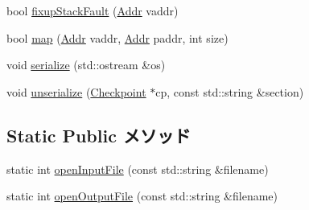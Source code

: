 \begin{DoxyCompactItemize}
\item 
bool \hyperlink{classProcess_a5bfc8cca2ce6b8a330e0c209468e5f71}{fixupStackFault} (\hyperlink{base_2types_8hh_af1bb03d6a4ee096394a6749f0a169232}{Addr} vaddr)
\item 
bool \hyperlink{classProcess_ac2bb68c3c87d0a046f848f537abb23fc}{map} (\hyperlink{base_2types_8hh_af1bb03d6a4ee096394a6749f0a169232}{Addr} vaddr, \hyperlink{base_2types_8hh_af1bb03d6a4ee096394a6749f0a169232}{Addr} paddr, int size)
\item 
void \hyperlink{classProcess_a53e036786d17361be4c7320d39c99b84}{serialize} (std::ostream \&os)
\item 
void \hyperlink{classProcess_af22e5d6d660b97db37003ac61ac4ee49}{unserialize} (\hyperlink{classCheckpoint}{Checkpoint} $\ast$cp, const std::string \&section)
\end{DoxyCompactItemize}
\subsection*{Static Public メソッド}
\begin{DoxyCompactItemize}
\item 
static int \hyperlink{classProcess_acea5ecbb223871b0d852b03b68837461}{openInputFile} (const std::string \&filename)
\item 
static int \hyperlink{classProcess_a230c9c6213b49eef2273fa99e3a511ba}{openOutputFile} (const std::string \&filename)
\end{DoxyCompactItemize}
